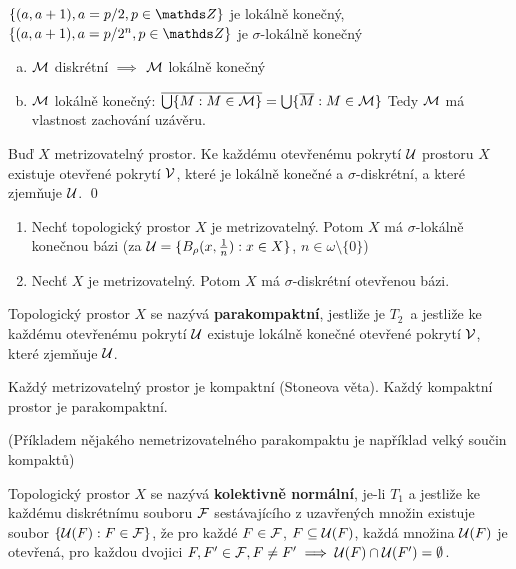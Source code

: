 \documentclass[12pt,a4paper]{article}
\newcommand{\head}[1]{\medskip\noindent {\bf #1}}
\newcommand\Hausd{$T_2$\xspace}
\newcommand\close{\overline}
\begin{document}
\priklad $\{(a, a+1), a = p / 2, p \in \Z\}$ je lokálně konečný, $\{(a, a+1), a = p / 2^n, p \in \Z\}$ je $\sigma$-lokálně konečný

\poznamka
\begin{enumerate}[(a)]
	\item $\mathcal{ M }$ diskrétní $\implies$ $\mathcal{ M }$ lokálně konečný
	\item $\mathcal{ M }$ lokálně konečný: $\close{\bigcup \{M : M \in \p M\}} = \bigcup \{\close M : M \in \p M\}$ Tedy $\mathcal{ M }$ má vlastnost zachování uzávěru.
\end{enumerate}

\veta[A. H. Stone]
	Buď $X$ metrizovatelný prostor. Ke každému otevřenému pokrytí $\mathcal{ U }$
	prostoru $X$ existuje otevřené pokrytí $\mathcal{ V }$, které je lokálně konečné a
	$\sigma$-diskrétní, a které zjemňuje $\mathcal{ U }$.
\dukaz \qed

\head{Důsledky:}
\begin{enumerate}
	\item Nechť topologický prostor $X$ je metrizovatelný. Potom $X$ má
	$\sigma$-lokálně konečnou bázi (za $\mathcal{ U }=\{B_\rho(x, \frac{1}{n}) : x \in
	X\}$, $n \in \omega \setminus \{0\}$)

	\item Nechť $X$ je metrizovatelný. Potom $X$ má $\sigma$-diskrétní
		otevřenou bázi.
\end{enumerate}

 Topologický prostor $X$ se nazývá {\bf parakompaktní}, jestliže je
	\Hausd~a jestliže ke každému otevřenému pokrytí $\mathcal{ U }$ existuje lokálně
	konečné otevřené pokrytí $\mathcal{ V }$, které zjemňuje $\mathcal{ U }$.

\priklad Každý metrizovatelný prostor je kompaktní (Stoneova věta). Každý
	kompaktní prostor je parakompaktní.

(Příkladem nějakého nemetrizovatelného parakompaktu je například velký součin
kompaktů)

 Topologický prostor $X$ se nazývá {\bf kolektivně normální}, je-li
	$T_1$ a jestliže ke každému diskrétnímu souboru $\mathcal{ F }$ sestávajícího z
	uzavřených množin existuje soubor $\{\mathcal{ U }(F) : F \in \mathcal{ F }\}$, že pro každé
	$F \in \mathcal{ F }$, $F \subseteq \mathcal{ U }(F)$, každá množina $\mathcal{ U }(F)$ je otevřená,
	pro každou dvojici $F, F' \in \mathcal{ F }, F \neq F' \implies \mathcal{ U }(F) \cap \mathcal{ U }(F') = \emptyset$.
\end{document}
